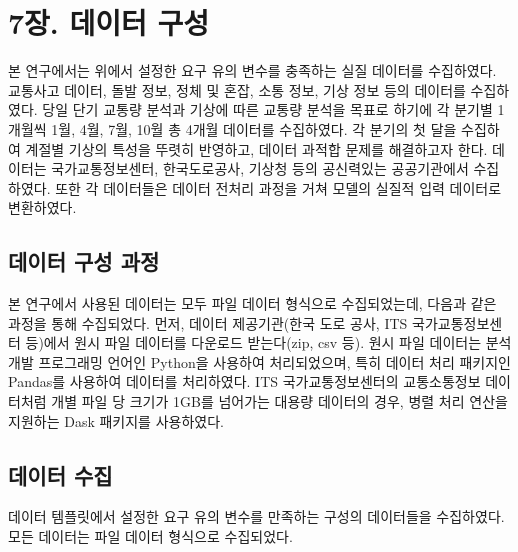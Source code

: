 \documentclass[11pt]{report}
\begin{document}
\chapter*{7장. 데이터 구성}
\setcounter{chapter}{7}
\setcounter{section}{0}
\setcounter{subsection}{0}

본 연구에서는 위에서 설정한 요구 유의 변수를 충족하는 실질 데이터를 수집하였다. 
교통사고 데이터, 돌발 정보, 정체 및 혼잡, 소통 정보, 기상 정보 등의 데이터를 수집하였다. 
당일 단기 교통량 분석과 기상에 따른 교통량 분석을 목표로 하기에 각 분기별 1개월씩 1월, 4월, 7월, 10월 총 4개월 데이터를 수집하였다. 
각 분기의 첫 달을 수집하여 계절별 기상의 특성을 뚜렷히 반영하고, 데이터 과적합 문제를 해결하고자 한다. 
데이터는 국가교통정보센터, 한국도로공사, 기상청 등의 공신력있는 공공기관에서 수집하였다. 
또한 각 데이터들은 데이터 전처리 과정을 거쳐 모델의 실질적 입력 데이터로 변환하였다. 

\section{데이터 구성 과정}
본 연구에서 사용된 데이터는 모두 파일 데이터 형식으로 수집되었는데, 다음과 같은 과정을 통해 수집되었다. 
먼저, 데이터 제공기관(한국 도로 공사, ITS 국가교통정보센터 등)에서 원시 파일 데이터를 다운로드 받는다(zip, csv 등). 
원시 파일 데이터는 분석 개발 프로그래밍 언어인 Python을 사용하여 처리되었으며, 특히 데이터 처리 패키지인 Pandas를 사용하여 데이터를 처리하였다. 
ITS 국가교통정보센터의 교통소통정보 데이터처럼 개별 파일 당 크기가 1GB를 넘어가는 대용량 데이터의 경우, 병렬 처리 연산을 지원하는 Dask 패키지를 사용하였다. 

\section{데이터 수집}
데이터 템플릿에서 설정한 요구 유의 변수를 만족하는 구성의 데이터들을 수집하였다. 
모든 데이터는 파일 데이터 형식으로 수집되었다. 
\end{document}

